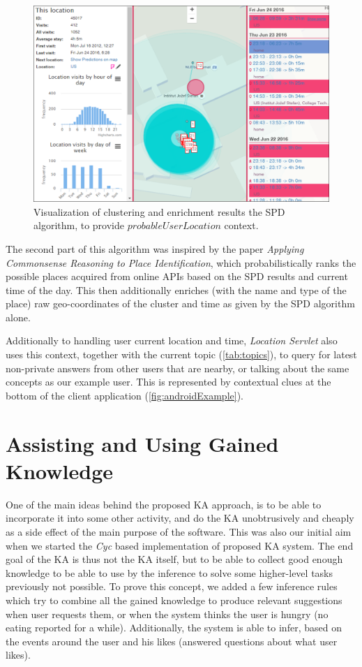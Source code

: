 \begin{figure}[htb]
	\centering
		\includegraphics[width=1\textwidth]{figures/nextPin.png}
	\caption{Visualization of clustering and enrichment results the SPD
algorithm, to provide $probableUserLocation$ context.}
	\label{fig:nextPin}
\end{figure}

The second part of this algorithm was inspired by the paper \emph{Applying 
Commonsense Reasoning to Place Identification}\parencite{Mamei2010}, which
probabilistically ranks the possible places acquired from online APIs based on the
SPD results and current time of the day. This then additionally enriches (with
the name and type of the place) raw geo-coordinates of the cluster and time 
as given by the SPD algorithm alone. 

Additionally to handling user current location and time, 
\emph{Location Servlet} also uses this context, together with the current topic
(\autoref{tab:topics}), to query for latest non-private answers from other
users that are nearby, or talking about the same concepts as our example user.
This is represented by contextual clues at the bottom of the client application
(\autoref{fig:androidExample}).

\section{Assisting and Using Gained Knowledge}
\label{section:usage}

One of the main ideas behind the proposed KA approach, is to be able to
incorporate
it into some other activity, and do the KA unobtrusively and cheaply as a side
effect of the main purpose of the software. This was also our initial aim when
we started the \emph{Cyc} based implementation of proposed KA system. The end 
goal of the KA is thus not the KA itself, but to be able to collect good 
enough knowledge to be able to use by the inference to solve some higher-level 
tasks previously not possible. To prove this concept, we added a few inference 
rules which try to combine all the gained knowledge to produce relevant 
suggestions when user requests them, or when the system thinks the user is 
hungry (no eating reported for a while). Additionally, the system is able to 
infer, based on the events around the user and his likes (answered questions 
about what user likes).

